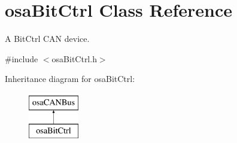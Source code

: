\hypertarget{classosa_bit_ctrl}{}\section{osa\+Bit\+Ctrl Class Reference}
\label{classosa_bit_ctrl}


A Bit\+Ctrl C\+A\+N device.  




{\ttfamily \#include $<$osa\+Bit\+Ctrl.\+h$>$}

Inheritance diagram for osa\+Bit\+Ctrl\+:\begin{figure}[H]
\begin{center}
\leavevmode
\includegraphics[height=2.000000cm]{d5/d34/classosa_bit_ctrl}
\end{center}
\end{figure}

